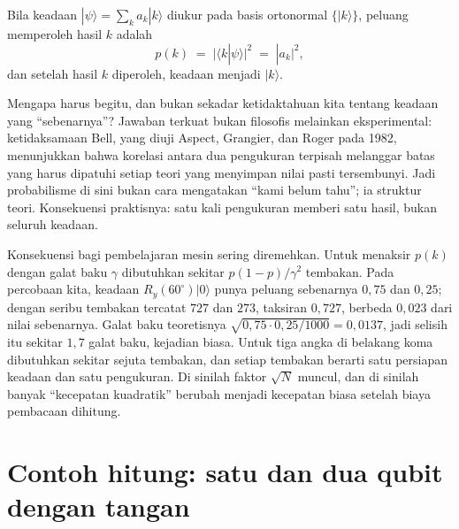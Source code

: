 \begin{definisi}
Bila keadaan $|\psi\rangle=\sum_k a_k|k\rangle$ diukur pada basis ortonormal
$\{|k\rangle\}$, peluang memperoleh hasil $k$ adalah
\begin{equation}
p(k) \;=\; \bigl|\langle k|\psi\rangle\bigr|^{2} \;=\; |a_k|^{2},
\end{equation}
dan setelah hasil $k$ diperoleh, keadaan menjadi $|k\rangle$.
\end{definisi}

Mengapa harus begitu, dan bukan sekadar ketidaktahuan kita tentang keadaan yang
``sebenarnya''? Jawaban terkuat bukan filosofis melainkan eksperimental: ketidaksamaan
Bell, yang diuji Aspect, Grangier, dan Roger pada 1982, menunjukkan bahwa korelasi antara
dua pengukuran terpisah melanggar batas yang harus dipatuhi setiap teori yang menyimpan
nilai pasti tersembunyi. Jadi probabilisme di sini bukan cara mengatakan ``kami belum
tahu''; ia struktur teori. Konsekuensi praktisnya: satu kali pengukuran memberi satu
hasil, bukan seluruh keadaan.


Konsekuensi bagi pembelajaran mesin sering diremehkan. Untuk menaksir $p(k)$ dengan
galat baku $\gamma$ dibutuhkan sekitar $p(1-p)/\gamma^{2}$ tembakan. Pada percobaan kita,
keadaan $R_y(60^\circ)|0\rangle$ punya peluang sebenarnya $0{,}75$ dan $0{,}25$; dengan
seribu tembakan tercatat $727$ dan $273$, taksiran $0{,}727$, berbeda $0{,}023$ dari
nilai sebenarnya. Galat baku teoretisnya $\sqrt{0{,}75\cdot 0{,}25/1000}=0{,}0137$, jadi
selisih itu sekitar $1{,}7$ galat baku, kejadian biasa. Untuk tiga angka di belakang koma dibutuhkan sekitar sejuta
tembakan, dan setiap tembakan berarti satu persiapan keadaan dan satu pengukuran. Di
sinilah faktor $\sqrt{N}$ muncul, dan di sinilah banyak ``kecepatan kuadratik'' berubah
menjadi kecepatan biasa setelah biaya pembacaan dihitung.

\section{Contoh hitung: satu dan dua qubit dengan tangan}

